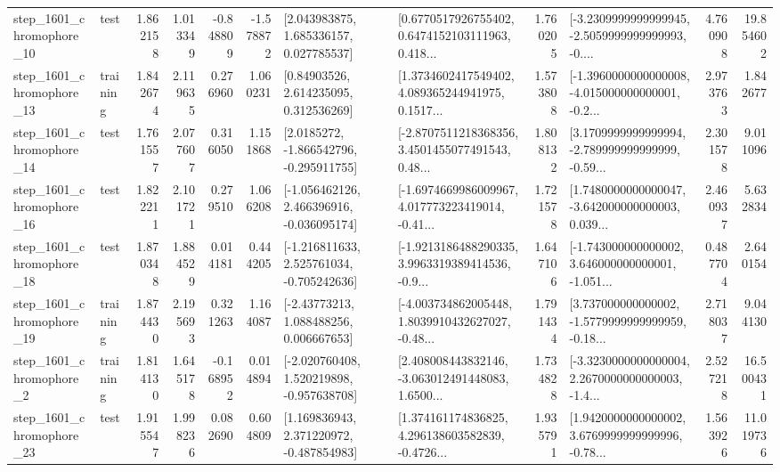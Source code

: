 \begin{tabular}{llrrrrllrlrr}
 step\_1601\_chromophore\_10 &      test &      1.862158 &    1.013349 &     -0.848809 & -1.578872 &     [2.043983875, 1.685336157, 0.027785537] &  [0.6770517926755402, 0.6474152103111963, 0.418... &       1.760205 &  [-3.2309999999999945, -2.5059999999999993, -0.... &            4.760908 &         19.854602 \\
 step\_1601\_chromophore\_13 &  training &      1.842674 &    2.119635 &      0.276960 &  1.060231 &      [0.84903526, 2.614235095, 0.312536269] &  [1.3734602417549402, 4.089365244941975, 0.1517... &       1.573808 &  [-1.3960000000000008, -4.015000000000001, -0.2... &            2.973763 &          1.842677 \\
 step\_1601\_chromophore\_14 &      test &      1.761557 &    2.077607 &      0.316050 &  1.151868 &     [2.0185272, -1.866542796, -0.295911755] &  [-2.8707511218368356, 3.4501455077491543, 0.48... &       1.808132 &  [3.1709999999999994, -2.789999999999999, -0.59... &            2.301578 &          9.011096 \\
 step\_1601\_chromophore\_16 &      test &      1.822211 &    2.101721 &      0.279510 &  1.066208 &   [-1.056462126, 2.466396916, -0.036095174] &  [-1.6974669986009967, 4.017773223419014, -0.41... &       1.721578 &  [1.7480000000000047, -3.642000000000003, 0.039... &            2.460937 &          5.632834 \\
 step\_1601\_chromophore\_18 &      test &      1.870348 &    1.884529 &      0.014181 &  0.444205 &   [-1.216811633, 2.525761034, -0.705242636] &  [-1.9213186488290335, 3.9963319389414536, -0.9... &       1.647106 &  [-1.743000000000002, 3.646000000000001, -1.051... &            0.487704 &          2.640154 \\
 step\_1601\_chromophore\_19 &  training &      1.874430 &    2.195693 &      0.321263 &  1.164087 &     [-2.43773213, 1.088488256, 0.006667653] &  [-4.003734862005448, 1.8039910432627027, -0.48... &       1.791434 &  [3.737000000000002, -1.5779999999999959, -0.18... &            2.718037 &          9.044130 \\
  step\_1601\_chromophore\_2 &  training &      1.814130 &    1.645178 &     -0.168952 &  0.014894 &   [-2.020760408, 1.520219898, -0.957638708] &  [2.408008443832146, -3.063012491448083, 1.6500... &       1.734828 &  [-3.3230000000000004, 2.2670000000000003, -1.4... &            2.527218 &         16.500431 \\
 step\_1601\_chromophore\_23 &      test &      1.915547 &    1.998236 &      0.082690 &  0.604809 &    [1.169836943, 2.371220972, -0.487854983] &  [1.374161174836825, 4.296138603582839, -0.4726... &       1.935791 &  [1.9420000000000002, 3.6769999999999996, -0.78... &            1.563926 &         11.019736 \\

\end{tabular}
